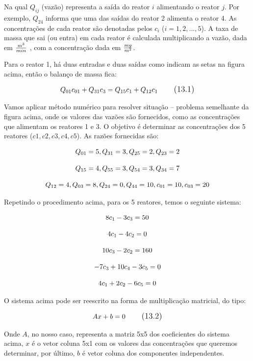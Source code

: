 Na qual $Q_{ij}$ (vazão) representa a saída do reator $i$ alimentando o reator $j$. Por exemplo, $Q_{24}$ informa que uma das saídas do reator 2 alimenta o reator 4. As concentrações de cada reator são denotadas pelos $c_{i}$ ($i = 1, 2, ..., 5$). A taxa de massa que sai (ou entra) em cada reator é calculada multiplicando a vazão, dada em  $\large \frac{m^3}{min}$ , com a concentração dada em $\large \frac{mg}{m^3}$. 

Para o reator 1, há duas entradas e duas saídas como indicam as setas na figura acima, então o balanço de massa fica:

\begin{equation}
\large Q_{01} c_{01}  + Q_{31} c_{3}  = Q_{15} c_{1}+ Q_{12} c_{1}
\tag{13.1}
\end{equation}

Vamos aplicar método numérico para resolver situação – problema semelhante da figura acima, onde os valores das vazões são fornecidos, como as concentrações que alimentam os reatores 1 e 3. O objetivo é determinar as concentrações dos 5 reatores ($c1, c2, c3, c4, c5$). 
As razões fornecidas são: 

$$
\large Q_{01} = 5, Q_{31} = 3, Q_{25} = 2, Q_{23} = 2
$$

$$
\large Q_{15} = 4, Q_{55} = 3, Q_{54} = 3, Q_{34} = 7
$$

$$
\large Q_{12} = 4, Q_{03} = 8, Q_{24} = 0, Q_{44} = 10, c_{01} = 10, c_{03} = 20
$$

Repetindo o procedimento acima, para os 5 reatores, temos o seguinte sistema:

$$\large 8c_{1}  - 3c_{3}  = 50$$

$$\large 4c_{1}  - 4c_{2}  = 0$$

$$\large 10c_{3}  - 2c_{2}  = 160$$

$$\large -7c_{3} + 10c_{4} - 3c_{5}  = 0$$

$$\large 4c_{1}  +2c_{2}  -6c_{5}  = 0$$

O sistema acima pode ser reescrito na forma de multiplicação matricial, do tipo:

\begin{equation}
\large Ax + b = 0
\tag{13.2}
\end{equation}

Onde $A$, no nosso caso, representa a matriz 5x5 dos coeficientes do sistema
acima, $x$ é o vetor coluna 5x1 com os valores das concentrações que queremos determinar, por último, $b$ é vetor coluna dos componentes independentes.


